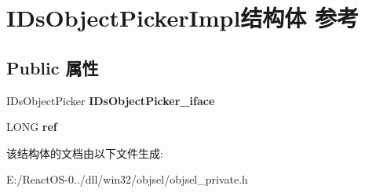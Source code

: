 \hypertarget{struct_i_ds_object_picker_impl}{}\section{I\+Ds\+Object\+Picker\+Impl结构体 参考}
\label{struct_i_ds_object_picker_impl}
\subsection*{Public 属性}
\begin{DoxyCompactItemize}
\item 
\mbox{\label{struct_i_ds_object_picker_impl_a368e251909f19749e7592e280cc77f6d}} 
I\+Ds\+Object\+Picker {\bfseries I\+Ds\+Object\+Picker\+\_\+iface}
\item 
\mbox{\label{struct_i_ds_object_picker_impl_a1009ee22d3c38d97edf65ed5329af4e0}} 
L\+O\+NG {\bfseries ref}
\end{DoxyCompactItemize}


该结构体的文档由以下文件生成\+:\begin{DoxyCompactItemize}
\item 
E\+:/\+React\+O\+S-\/0../dll/win32/objsel/objsel\+\_\+private.\+h\end{DoxyCompactItemize}
